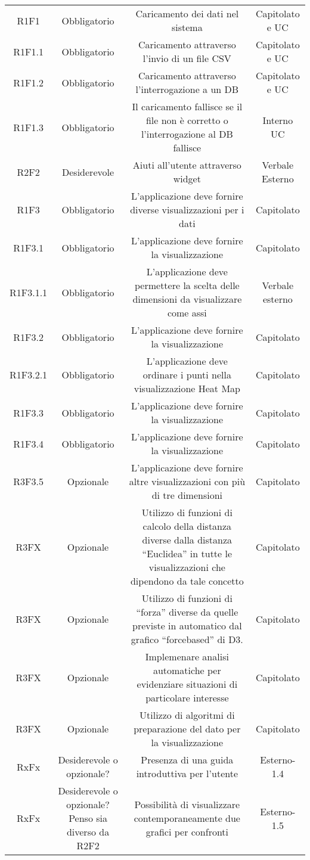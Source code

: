 \begin{center}
\begin{longtable}{C{\colA} C{\colB} C{\colC} C{\colA}}
R1F1 & Obbligatorio & Caricamento dei dati nel sistema & Capitolato e UC\\
R1F1.1 & Obbligatorio & Caricamento attraverso l'invio di un file CSV & Capitolato e UC\\
R1F1.2 & Obbligatorio & Caricamento attraverso l'interrogazione a un DB & Capitolato e UC\\
R1F1.3 & Obbligatorio & Il caricamento fallisce se il file non è corretto o l'interrogazione al DB fallisce & Interno UC\\
R2F2 & Desiderevole & Aiuti all'utente attraverso widget & Verbale Esterno\\
R1F3 & Obbligatorio & L'applicazione deve fornire diverse visualizzazioni per i dati & Capitolato\\
R1F3.1 & Obbligatorio & L'applicazione deve fornire la visualizzazione  & Capitolato\\
R1F3.1.1 & Obbligatorio & L'applicazione deve permettere la scelta delle dimensioni da visualizzare come assi & Verbale esterno\\
R1F3.2 & Obbligatorio & L'applicazione deve fornire la visualizzazione  & Capitolato\\
R1F3.2.1 & Obbligatorio & L'applicazione deve ordinare i punti nella visualizzazione Heat Map & Capitolato \\
R1F3.3 & Obbligatorio & L'applicazione deve fornire la visualizzazione  & Capitolato\\
R1F3.4 & Obbligatorio & L'applicazione deve fornire la visualizzazione  & Capitolato \\
R3F3.5 & Opzionale & L'applicazione deve fornire altre visualizzazioni con più di tre dimensioni & Capitolato\\
R3FX & Opzionale & Utilizzo di funzioni di calcolo della distanza diverse dalla distanza “Euclidea” in tutte le visualizzazioni che dipendono da tale concetto & Capitolato \\
R3FX & Opzionale & Utilizzo di funzioni di “forza” diverse da quelle previste in automatico dal grafico “forcebased” di D3. & Capitolato\\
R3FX & Opzionale & Implemenare analisi automatiche per evidenziare situazioni di particolare interesse & Capitolato\\
R3FX & Opzionale & Utilizzo di algoritmi di preparazione del dato per la visualizzazione & Capitolato\\
RxFx & Desiderevole o opzionale? & Presenza di una guida introduttiva per l'utente & Esterno-1.4\\
RxFx & Desiderevole o opzionale? Penso sia diverso da R2F2 & Possibilità di visualizzare contemporaneamente due grafici per confronti & Esterno-1.5\\

\end{longtable}
\end{center}



